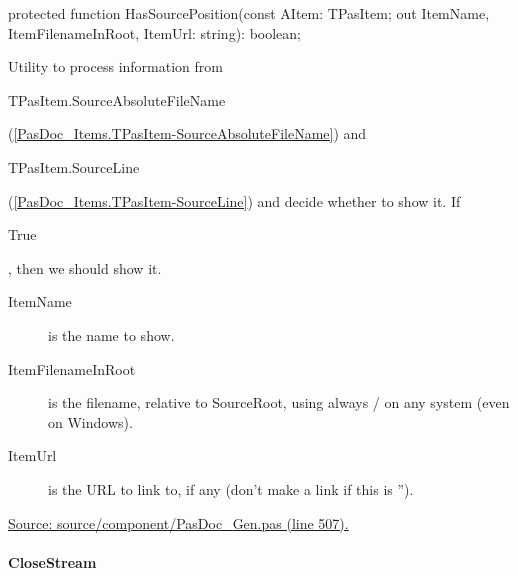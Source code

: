 \documentclass{report}
\newif\ifpdf
\begin{document}
\label{PasDoc_Gen.TDocGenerator-HasSourcePosition}
\begin{list}{}{
\setlength{\itemindent}{0cm}
\setlength{\listparindent}{0cm}
\setlength{\leftmargin}{\evensidemargin}
\addtolength{\leftmargin}{\tmplength}
\settowidth{\labelsep}{X}
\addtolength{\leftmargin}{\labelsep}
\setlength{\labelwidth}{\tmplength}
}
\item[\textbf{Declaration}\hfill]
\ifpdf
\begin{flushleft}
\fi
\begin{ttfamily}
protected function HasSourcePosition(const AItem: TPasItem; out ItemName, ItemFilenameInRoot, ItemUrl: string): boolean;\end{ttfamily}

\ifpdf
\end{flushleft}
\fi

\par
\item[\textbf{Description}]
Utility to process information from \begin{ttfamily}TPasItem.SourceAbsoluteFileName\end{ttfamily}(\ref{PasDoc_Items.TPasItem-SourceAbsoluteFileName}) and \begin{ttfamily}TPasItem.SourceLine\end{ttfamily}(\ref{PasDoc_Items.TPasItem-SourceLine}) and decide whether to show it. If \begin{ttfamily}True\end{ttfamily}, then we should show it.

  \par
\item[\textbf{Parameters}]
\begin{description}
\item[ItemName] is the name to show.
\item[ItemFilenameInRoot] is the filename, relative to SourceRoot, using always / on any system (even on Windows).
\item[ItemUrl] is the URL to link to, if any (don't make a link if this is '').
\end{description}
\par
\href{https://github.com/pasdoc/pasdoc/blob/master/source/component/PasDoc_Gen.pas#L507}{Source: source/component/PasDoc{\_}Gen.pas (line 507).}

\end{list}
\paragraph*{CloseStream}\hspace*{\fill}
\end{document}
